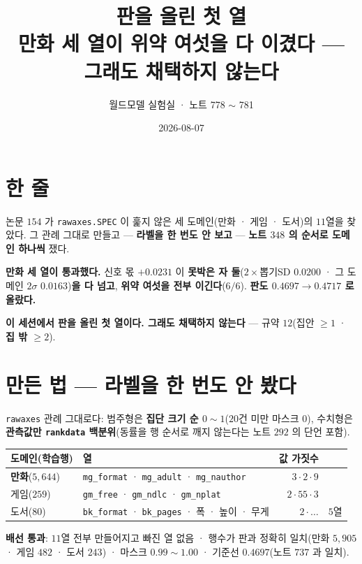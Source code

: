 \documentclass[10pt,a4paper]{article}
\title{\bfseries 판을 올린 첫 열\\[2pt]
\large 만화 세 열이 위약 여섯을 다 이겼다 --- 그래도 채택하지 않는다}
\author{월드모델 실험실 · 노트 778 $\sim$ 781}
\date{2026-08-07}
\begin{document}
\maketitle

\section{한 줄}

논문 $154$ 가 \texttt{rawaxes.SPEC} 이 훑지 않은 세 도메인(만화 · 게임 · 도서)의
$11$열을 찾았다. 그 관례 그대로 만들고 --- \textbf{라벨을 한 번도 안 보고} ---
\textbf{노트 $348$ 의 순서로 도메인 하나씩} 쟀다.

\textbf{만화 세 열이 통과했다.} 신호 몫 $\mathbf{+0.0231}$ 이 \textbf{못박은 자
둘}($2 \times$뽑기SD $0.0200$ · 그 도메인 $2\sigma$ $0.0163$)\textbf{을 다 넘고},
\textbf{위약 여섯을 전부 이긴다}($6/6$). \textbf{판도 $0.4697 \to 0.4717$ 로
올랐다.}

\textbf{이 세션에서 판을 올린 첫 열이다. 그래도 채택하지 않는다} --- 규약
$12$(집안 $\geq 1$ · \textbf{집 밖 $\geq 2$}).

\section{만든 법 --- 라벨을 한 번도 안 봤다}

\texttt{rawaxes} 관례 그대로다: 범주형은 \textbf{집단 크기 순 $0{\sim}1$}($20$건 미만
마스크 $0$), 수치형은 \textbf{관측값만 \texttt{rankdata} 백분위}(동률을 행 순서로
깨지 않는다는 노트 $292$ 의 단언 포함).

\begin{center}
\begin{tabular}{llrl}
\toprule
도메인(학습행) & 열 & 값 가짓수 & \\
\midrule
\textbf{만화}($5{,}644$) & \texttt{mg\_format} · \texttt{mg\_adult} · \texttt{mg\_nauthor} & $3 \cdot 2 \cdot 9$ & \\
게임($259$) & \texttt{gm\_free} · \texttt{gm\_ndlc} · \texttt{gm\_nplat} & $2 \cdot 55 \cdot 3$ & \\
도서($80$) & \texttt{bk\_format} · \texttt{bk\_pages} · 폭 · 높이 · 무게 & $2 \cdot \ldots$ & $5$열 \\
\bottomrule
\end{tabular}
\end{center}

\textbf{배선 통과}: $11$열 전부 만들어지고 빠진 열 없음 · 행수가 판과 정확히
일치(만화 $5{,}905$ · 게임 $482$ · 도서 $243$) · 마스크 $0.99{\sim}1.00$ · 기준선
$0.4697$(노트 $737$ 과 일치).
\end{document}
